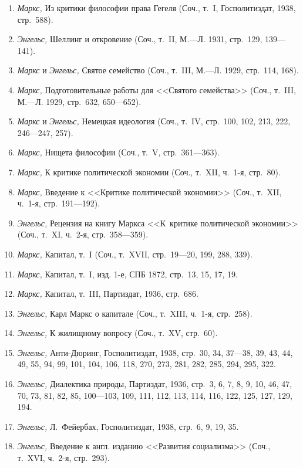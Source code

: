 \begin{enumerate}
\item {\em Маркс,} Из критики философии права Гегеля (Соч., т.~I,
Госполитиздат, 1938, стр.~588).
\item {\em Энгельс,} Шеллинг и откровение (Соч., т.~II, М.---Л. 1931,
стр.~129, 139---141).
\item {\em Маркс} и {\em Энгельс,} Святое семейство (Соч., т.~III, М.---Л.
1929, стр.~114, 168).
\item {\em Маркс,} Подготовительные работы для <<Святого семейства>> (Соч.,
т.~III, М.---Л. 1929, стр.~632, 650---652).
\item {\em Маркс} и {\em Энгельс,}
Немецкая идеология (Соч., т.~IV, стр.~100, 102, 213, 222, 246---247, 257).
\item {\em Маркс,} Нищета философии (Соч., т.~V, стр.~361---363).
\item {\em Маркс,} К критике политической экономии (Соч., т.~XII, ч.~1-я,
стр.~80).
\item {\em Маркс,} Введение к <<Критике политической экономии>> (Соч., т.~XII,
ч.~1-я, стр.~191---192).
\item {\em Энгельс,} Рецензия на книгу Маркса <<К~критике политической
экономии>> (Соч., т.~XI, ч.~2-я, стр.~358---359).
\item {\em Маркс,} Капитал, т.~I (Соч., т.~XVII, стр.~19---20, 199, 288, 339).
\item {\em Маркс,} Капитал, т.~I, изд. 1-е, СПБ 1872, стр.~13, 15, 17, 19.
\item {\em Маркс,} Капитал, т.~III, Партиздат, 1936, стр.~686.
\item {\em Энгельс,} Карл Маркс о капитале (Соч., т.~XIII, ч.~1-я, стр.~258).
\item {\em Энгельс,} К жилищному вопросу (Соч., т.~XV, стр.~60).
\item {\em Энгельс,} Анти-Дюринг, Госполитиздат, 1938, стр.~30, 34, 37---38,
39, 43, 44, 49, 55, 94, 99, 101, 104, 106, 118, 270, 273, 281, 282, 285, 294,
295, 322.
\item {\em Энгельс,} Диалектика природы, Партиздат, 1936, стр.~3, 6, 7, 8, 9, 10,
46, 47, 70, 73, 81, 82, 85, 100---103, 109, 111, 112, 113, 114, 116, 122,
125, 127, 129, 194.
\item {\em Энгельс,} Л.~Фейербах, Госполитиздат, 1938, стр.~6, 9, 19, 35.
\item {\em Энгельс,} Введение к англ. изданию <<Развития социализма>> (Соч.,
т.~XVI, ч.~2-я, стр.~293).
\end{enumerate}

